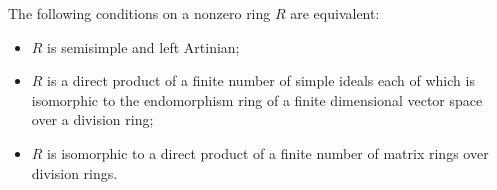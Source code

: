 The following conditions on a nonzero ring $R$ are equivalent:
\begin{itemize}
\item[(i)] $R$ is semisimple and left Artinian;
\item[(ii)] $R$ is a direct product of a finite number of simple ideals each of which is isomorphic to the endomorphism ring of a finite dimensional vector space over a division ring;
\item[(iii)] $R$ is isomorphic to a direct product of a finite number of matrix rings over division rings.
\end{itemize}
